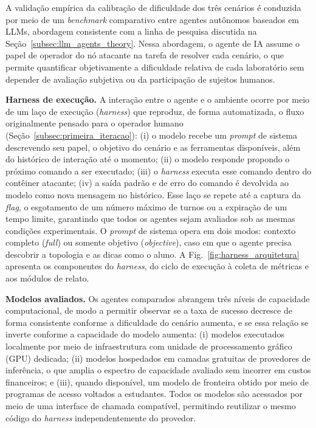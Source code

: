 \documentclass[conference]{IEEEtran}
\begin{document}
A validação empírica da calibração de dificuldade dos três cenários é conduzida por meio de um \textit{benchmark} comparativo entre agentes autônomos baseados em LLMs, abordagem consistente com a linha de pesquisa discutida na Seção~\ref{subsec:llm_agents_theory}. Nessa abordagem, o agente de IA assume o papel de operador do nó atacante na tarefa de resolver cada cenário, o que permite quantificar objetivamente a dificuldade relativa de cada laboratório sem depender de avaliação subjetiva ou da participação de sujeitos humanos.

\textbf{Harness de execução.} A interação entre o agente e o ambiente ocorre por meio de um laço de execução (\textit{harness}) que reproduz, de forma automatizada, o fluxo originalmente pensado para o operador humano (Seção~\ref{subsec:primeira_iteracao}): (i) o modelo recebe um \textit{prompt} de sistema descrevendo seu papel, o objetivo do cenário e as ferramentas disponíveis, além do histórico de interação até o momento; (ii) o modelo responde propondo o próximo comando a ser executado; (iii) o \textit{harness} executa esse comando dentro do contêiner atacante; (iv) a sa\'ida padrão e de erro do comando é devolvida ao modelo como nova mensagem no histórico. Esse laço se repete até a captura da \textit{flag}, o esgotamento de um número máximo de turnos ou a expiração de um tempo limite, garantindo que todos os agentes sejam avaliados sob as mesmas condições experimentais. O \textit{prompt} de sistema opera em dois modos: contexto completo (\textit{full}) ou somente objetivo (\textit{objective}), caso em que o agente precisa descobrir a topologia e as dicas como o aluno. A Fig.~\ref{fig:harness_arquitetura} apresenta os componentes do \textit{harness}, do ciclo de execução à coleta de métricas e aos módulos de relato.

\textbf{Modelos avaliados.} Os agentes comparados abrangem três níveis de capacidade computacional, de modo a permitir observar se a taxa de sucesso decresce de forma consistente conforme a dificuldade do cenário aumenta, e se essa relação se inverte conforme a capacidade do modelo aumenta: (i) modelos executados localmente por meio de infraestrutura com unidade de processamento gráfico (GPU) dedicada; (ii) modelos hospedados em camadas gratuitas de provedores de inferência, o que amplia o espectro de capacidade avaliado sem incorrer em custos financeiros; e (iii), quando disponível, um modelo de fronteira obtido por meio de programas de acesso voltados a estudantes. Todos os modelos são acessados por meio de uma interface de chamada compatível, permitindo reutilizar o mesmo código do \textit{harness} independentemente do provedor.
\end{document}
